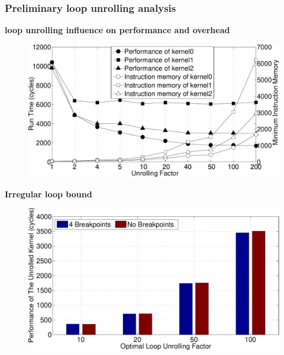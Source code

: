 \documentclass{beamer}
\begin{document}
\begin{frame}[t]
\frametitle{Preliminary loop unrolling analysis}

\vspace{-1em}
\textbf{loop unrolling influence on performance and overhead}
\begin{figure}
\vspace{-1em}
\includegraphics[width=0.6\linewidth]{loop-unrolling}
\vspace{-1em}
\end{figure}

\textbf{Irregular loop bound}
\begin{figure}
\vspace{-1em}
\includegraphics[width=0.6\linewidth]{any-loop-unrolling}
\vspace{-1em}
\end{figure}
\end{frame}
\end{document}
